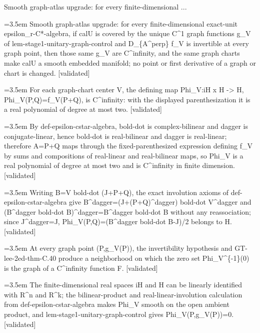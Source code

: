 \documentclass{article}
\newcommand{\step}[1]{\par\noindent\hangindent=3.5em\hangafter=1%
  \makebox[3.5em][l]{\textbf{#1.}}}
\newcommand{\steptag}[1]{\hfill{\small\textsf{[#1]}}}
\begin{document}
\begin{proofbox}{Smooth graph-atlas upgrade: for every finite-dimensional ...}
\step{1} Smooth graph-atlas upgrade: for every finite-dimensional exact-unit epsilon\_r-C*-algebra, if calU is covered by the unique C\textasciicircum{}1 graph functions g\_V of lem-stage1-unitary-graph-control and D\_\{A\textasciicircum{}perp\} f\_V is invertible at every graph point, then those same g\_V are C\textasciicircum{}infinity, and the same graph charts make calU a smooth embedded manifold; no point or first derivative of a graph or chart is changed. \steptag{validated} \\[6pt]
\step{1.1} For each graph-chart center V, the defining map Phi\_V:iH x H -> H, Phi\_V(P,Q)=f\_V(P+Q), is C\textasciicircum{}infinity: with the displayed parenthesization it is a real polynomial of degree at most two. \steptag{validated} \\[6pt]
\step{1.1.1} By def-epsilon-cstar-algebra, bold-dot is complex-bilinear and dagger is conjugate-linear, hence bold-dot is real-bilinear and dagger is real-linear; therefore A=P+Q maps through the fixed-parenthesized expression defining f\_V by sums and compositions of real-linear and real-bilinear maps, so Phi\_V is a real polynomial of degree at most two and is C\textasciicircum{}infinity in finite dimension. \steptag{validated} \\[4pt]
\step{1.1.2} Writing B=V bold-dot (J+P+Q), the exact involution axioms of def-epsilon-cstar-algebra give B\textasciicircum{}dagger=(J+(P+Q)\textasciicircum{}dagger) bold-dot V\textasciicircum{}dagger and (B\textasciicircum{}dagger bold-dot B)\textasciicircum{}dagger=B\textasciicircum{}dagger bold-dot B without any reassociation; since J\textasciicircum{}dagger=J, Phi\_V(P,Q)=(B\textasciicircum{}dagger bold-dot B-J)/2 belongs to H. \steptag{validated} \\[4pt]
\step{1.2} At every graph point (P,g\_V(P)), the invertibility hypothesis and GT-lee-2ed-thm-C.40 produce a neighborhood on which the zero set Phi\_V\textasciicircum{}\{-1\}(0) is the graph of a C\textasciicircum{}infinity function F. \steptag{validated} \\[6pt]
\step{1.2.1} The finite-dimensional real spaces iH and H can be linearly identified with R\textasciicircum{}n and R\textasciicircum{}k; the bilinear-product and real-linear-involution calculation from def-epsilon-cstar-algebra makes Phi\_V smooth on the open ambient product, and lem-stage1-unitary-graph-control gives Phi\_V(P,g\_V(P))=0. \steptag{validated} \\[4pt]

\end{proofbox}
\end{document}
